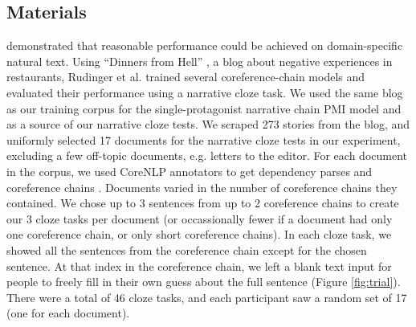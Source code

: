 \documentclass[10pt,a4paper]{article}
\begin{document}
\subsection{Materials}

 demonstrated that reasonable performance could be achieved on domain-specific natural text.
Using ``Dinners from Hell'' \cite{dinnersfromhell}, a blog about negative experiences in restaurants, Rudinger et al. trained several coreference-chain models and evaluated their performance using a narrative cloze task.
We used the same blog as our training corpus for the single-protagonist narrative chain PMI model and as a source of our narrative cloze tests.
We scraped 273 stories from the blog, and uniformly selected 17 documents for the narrative cloze tests in our experiment, excluding a few off-topic documents, e.g. letters to the editor.
For each document in the corpus, we used CoreNLP annotators \cite{corenlp} to get dependency parses \cite{depparse} and coreference chains \cite{coref2013a, coref2013b, coref2011, coref2010}.
Documents varied in the number of coreference chains they contained. We chose up to 3 sentences from up to 2 coreference chains to create our 3 cloze tasks per document (or occassionally fewer if a document had only one coreference chain, or only short coreference chains). In each cloze task, we showed all the sentences from the coreference chain except for the chosen sentence. At that index in the coreference chain, we left a blank text input for people to freely fill in their own guess about the full sentence (Figure \ref{fig:trial}). There were a total of 46 cloze tasks, and each participant saw a random set of 17 (one for each document).
\end{document}
